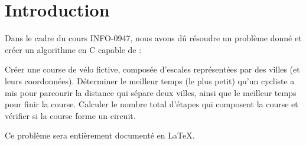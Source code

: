 \section{Introduction}\label{introduction}

Dans le cadre du cours INFO-0947, nous avons dû résoudre un problème donné et créer un algorithme en C capable de :

Créer une course de vélo fictive, composée d'escales représentées par des villes (et leurs coordonnées).
Déterminer le meilleur temps (le plus petit) qu'un cycliste a mis pour parcourir la distance qui sépare deux villes, ainsi que le meilleur temps pour finir la course.
Calculer le nombre total d'étapes qui composent la course et vérifier si la course forme un circuit.

Ce problème sera entièrement documenté en \LaTeX.

